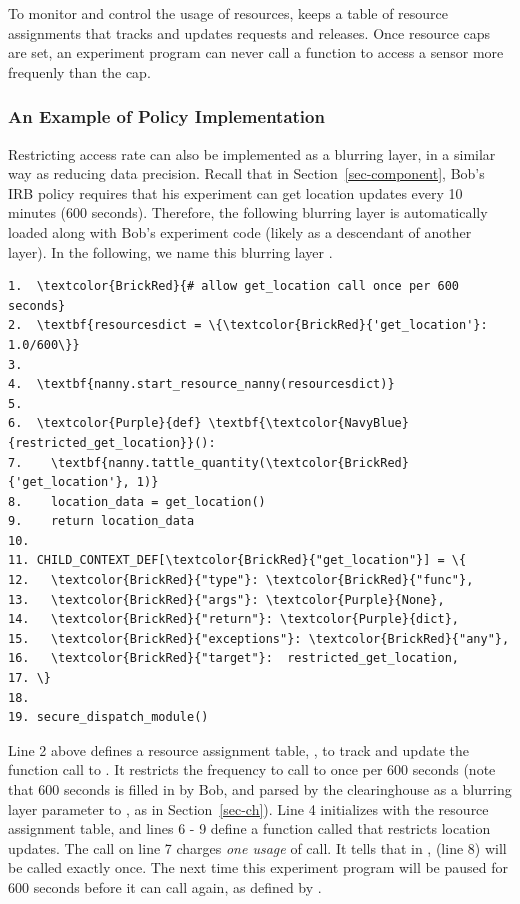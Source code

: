 To monitor and control the usage of resources,  keeps a 
table of resource assignments that tracks and updates requests and releases. 
Once resource caps are set, an experiment program can never call a 
function to access a sensor more frequenly than the cap. 

\subsubsection{An Example of Policy Implementation}\label{sec-rate-example}

Restricting access rate can also be implemented as a 
blurring layer, in a similar way as reducing data precision.
Recall that in Section~\ref{sec-component}, Bob's IRB policy requires that
his experiment can get location updates every 10 minutes (600 seconds). 
Therefore, the following blurring layer is automatically loaded along with 
Bob's experiment code (likely as a descendant of another layer). In 
the following, we name this blurring layer .

\begin{Verbatim}
1.  \textcolor{BrickRed}{# allow get_location call once per 600 seconds}
2.  \textbf{resourcesdict = \{\textcolor{BrickRed}{'get_location'}: 1.0/600\}} 
3.
4.  \textbf{nanny.start_resource_nanny(resourcesdict)}
5.
6.  \textcolor{Purple}{def} \textbf{\textcolor{NavyBlue}{restricted_get_location}}():
7.    \textbf{nanny.tattle_quantity(\textcolor{BrickRed}{'get_location'}, 1)}
8.    location_data = get_location()
9.    return location_data
10.
11. CHILD_CONTEXT_DEF[\textcolor{BrickRed}{"get_location"}] = \{
12.   \textcolor{BrickRed}{"type"}: \textcolor{BrickRed}{"func"},
13.   \textcolor{BrickRed}{"args"}: \textcolor{Purple}{None},
14.   \textcolor{BrickRed}{"return"}: \textcolor{Purple}{dict},
15.   \textcolor{BrickRed}{"exceptions"}: \textcolor{BrickRed}{"any"},
16.   \textcolor{BrickRed}{"target"}:  restricted_get_location,
17. \}
18. 
19. secure_dispatch_module()
\end{Verbatim}

Line 2 above defines a resource assignment table, , to track and update 
the function call to . It restricts the frequency to 
call  to once per 600 seconds (note that 
600 seconds is filled in by Bob, and parsed by the clearinghouse as a blurring layer 
parameter to , as in Section~\ref{sec-ch}). Line 4 initializes  
with the resource assignment table, and lines 6 - 9 define a 
function called  that restricts location updates. 
The  call on line 7 charges \textit{one usage} of  
call. It tells  that in , 
 (line 8) will be called exactly once. The
next time this experiment program 
will be paused for 600 seconds before it can call  again,
as defined by .

